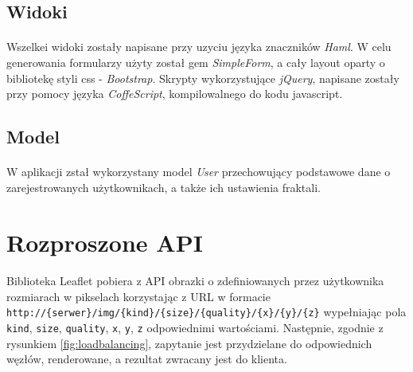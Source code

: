 \documentclass[wide,a4paper,titlepage,12pt]{article}
\begin{document}
\subsection{Widoki}
\paragraph{}
Wszelkei widoki zostały napisane przy uzyciu języka znaczników \textit{Haml}. W celu generowania 
formularzy użyty został gem \textit{SimpleForm}, a cały layout oparty o bibliotekę styli 
css - \textit{Bootstrap}. Skrypty wykorzystujące \textit{jQuery}, napisane zostały przy pomocy 
języka \textit{CoffeScript}, kompilowalnego do kodu javascript.

\subsection{Model}
\paragraph{}
W aplikacji zstał wykorzystany model \textit{User} przechowujący podstawowe dane o zarejestrowanych użytkownikach,
a także ich ustawienia fraktali.

\section{Rozproszone API}
\paragraph{}
Biblioteka Leaflet pobiera z API obrazki o zdefiniowanych przez użytkownika rozmiarach w pikselach
korzystając z URL w formacie \newline
 \texttt{http://\{serwer\}/img/\{kind\}/\{size\}/\{quality\}/\{x\}/\{y\}/\{z\}}
wypełniając pola \texttt{kind}, \texttt{size}, \texttt{quality}, \texttt{x}, \texttt{y}, \texttt{z} odpowiednimi
wartościami. Następnie, zgodnie z rysunkiem \ref{fig:loadbalancing}, zapytanie
jest przydzielane do odpowiednich węzłów, renderowane, a rezultat
zwracany jest do klienta.
\end{document}
